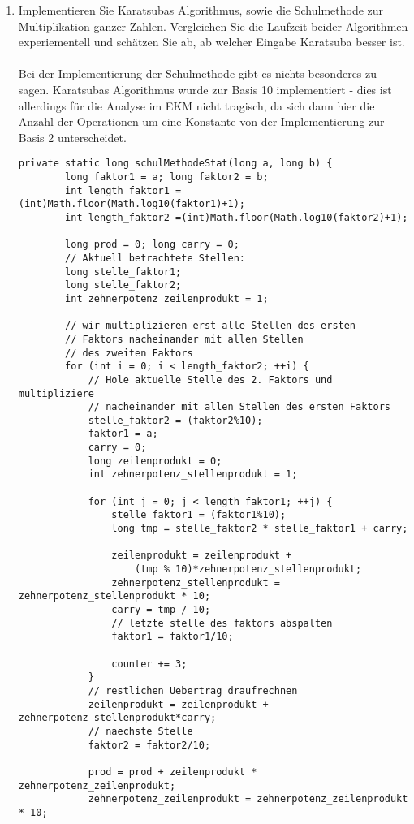 \documentclass[11pt,a4paper,ngerman]{article}
\begin{document}
\begin{enumerate}[\bfseries (a)]

\item Implementieren Sie Karatsubas Algorithmus, sowie die Schulmethode zur Multiplikation ganzer Zahlen. Vergleichen Sie die Laufzeit beider Algorithmen experiementell und schätzen Sie ab, ab welcher Eingabe Karatsuba besser ist.
\\ \\
Bei der Implementierung der Schulmethode gibt es nichts besonderes zu sagen. Karatsubas Algorithmus wurde zur Basis 10 implementiert - dies ist allerdings für die Analyse im EKM nicht tragisch, da sich dann hier die Anzahl der Operationen um eine Konstante von der Implementierung zur Basis 2 unterscheidet. 
\begin{lstlisting}
private static long schulMethodeStat(long a, long b) {
		long faktor1 = a; long faktor2 = b;
		int length_faktor1 = (int)Math.floor(Math.log10(faktor1)+1);
		int length_faktor2 =(int)Math.floor(Math.log10(faktor2)+1);
		
		long prod = 0; long carry = 0;
		// Aktuell betrachtete Stellen:
		long stelle_faktor1;
		long stelle_faktor2;
		int zehnerpotenz_zeilenprodukt = 1;
		
		// wir multiplizieren erst alle Stellen des ersten
		// Faktors nacheinander mit allen Stellen
		// des zweiten Faktors
		for (int i = 0; i < length_faktor2; ++i) {
			// Hole aktuelle Stelle des 2. Faktors und multipliziere
			// nacheinander mit allen Stellen des ersten Faktors
			stelle_faktor2 = (faktor2%10);
			faktor1 = a;
			carry = 0;
			long zeilenprodukt = 0; 
			int zehnerpotenz_stellenprodukt = 1;
			
			for (int j = 0; j < length_faktor1; ++j) {
				stelle_faktor1 = (faktor1%10);
				long tmp = stelle_faktor2 * stelle_faktor1 + carry;
				
				zeilenprodukt = zeilenprodukt +
					(tmp % 10)*zehnerpotenz_stellenprodukt;
				zehnerpotenz_stellenprodukt = zehnerpotenz_stellenprodukt * 10;
				carry = tmp / 10;
				// letzte stelle des faktors abspalten
				faktor1 = faktor1/10;
				
				counter += 3;
			}
			// restlichen Uebertrag draufrechnen
			zeilenprodukt = zeilenprodukt + zehnerpotenz_stellenprodukt*carry;
			// naechste Stelle
			faktor2 = faktor2/10;
			
			prod = prod + zeilenprodukt * zehnerpotenz_zeilenprodukt;
			zehnerpotenz_zeilenprodukt = zehnerpotenz_zeilenprodukt * 10;
			

\end{lstlisting}
\end{enumerate}
\end{document}
